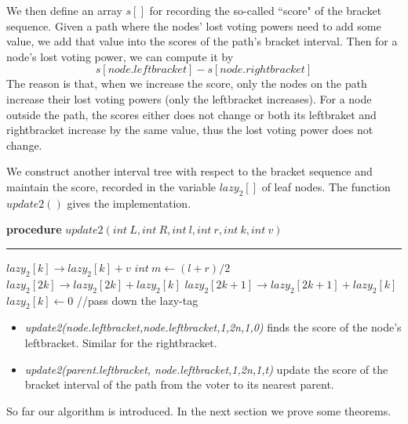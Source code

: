 We then define an array $s[]$ for recording the so-called ``score" of the bracket sequence. Given a path where the nodes' lost voting powers need to add some value, we add that value into the scores of the path's bracket interval. Then for a node's  lost voting power, we can compute it by
 $$s[node.leftbracket]-s[node.rightbracket]$$
 The reason is that, when we increase the score, only the nodes on the path increase their lost voting powers (only the leftbracket increases). For a node outside the path, the scores either does not change or both its leftbraket and rightbracket increase by the same value, thus the lost voting power does not change.

We construct another interval tree with respect to the bracket sequence  and maintain the score, recorded in the variable $lazy_2[]$ of leaf nodes. The function $update2()$ gives the implementation.
\begin{algorithm}
	\textbf{procedure} $update2(int~L,int ~R, int~l, int~r, int~k, int~v)$
	\hrule
	{
       $lazy_2[k] \rightarrow lazy_2[k]+v$
	}
	{
		$int~m \leftarrow (l+r)/2$\;
		$lazy_2[2k] \rightarrow lazy_2[2k]+lazy_2[k]$\;
		$lazy_2[2k+1]\rightarrow lazy_2[2k+1]+lazy_2[k]$\;
		$lazy_2[k] \leftarrow 0$
			{\color{gray}
		//pass down the lazy-tag}\;
    }
\end{algorithm}
\begin{itemize}
	\item {\em update2(node.leftbracket,node.leftbracket,1,2n,1,0)} finds the score of the node's leftbracket. Similar for the rightbracket. 
	\item {\em update2(parent.leftbracket, node.leftbracket,1,2n,1,t)} update the score of the bracket interval of the path from the voter to its nearest parent.
\end{itemize}
So far our algorithm is introduced. In the next section we prove some theorems.